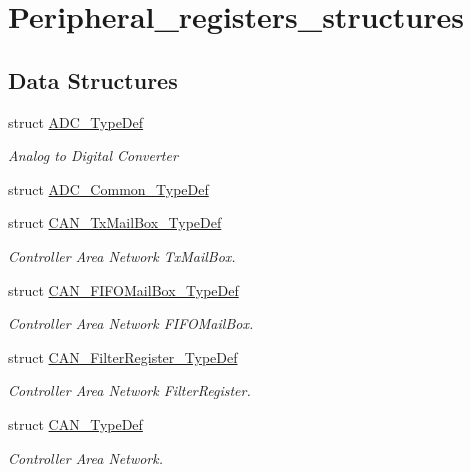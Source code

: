 \hypertarget{group___peripheral__registers__structures}{}\section{Peripheral\+\_\+registers\+\_\+structures}
\label{group___peripheral__registers__structures}
\subsection*{Data Structures}
\begin{DoxyCompactItemize}
\item 
struct \mbox{\hyperlink{struct_a_d_c___type_def}{A\+D\+C\+\_\+\+Type\+Def}}
\begin{DoxyCompactList}\small\item\em Analog to Digital Converter ~\newline
 \end{DoxyCompactList}\item 
struct \mbox{\hyperlink{struct_a_d_c___common___type_def}{A\+D\+C\+\_\+\+Common\+\_\+\+Type\+Def}}
\item 
struct \mbox{\hyperlink{struct_c_a_n___tx_mail_box___type_def}{C\+A\+N\+\_\+\+Tx\+Mail\+Box\+\_\+\+Type\+Def}}
\begin{DoxyCompactList}\small\item\em Controller Area Network Tx\+Mail\+Box. \end{DoxyCompactList}\item 
struct \mbox{\hyperlink{struct_c_a_n___f_i_f_o_mail_box___type_def}{C\+A\+N\+\_\+\+F\+I\+F\+O\+Mail\+Box\+\_\+\+Type\+Def}}
\begin{DoxyCompactList}\small\item\em Controller Area Network F\+I\+F\+O\+Mail\+Box. \end{DoxyCompactList}\item 
struct \mbox{\hyperlink{struct_c_a_n___filter_register___type_def}{C\+A\+N\+\_\+\+Filter\+Register\+\_\+\+Type\+Def}}
\begin{DoxyCompactList}\small\item\em Controller Area Network Filter\+Register. \end{DoxyCompactList}\item 
struct \mbox{\hyperlink{struct_c_a_n___type_def}{C\+A\+N\+\_\+\+Type\+Def}}
\begin{DoxyCompactList}\small\item\em Controller Area Network. \end{DoxyCompactList}\item 

\end{DoxyCompactItemize}
